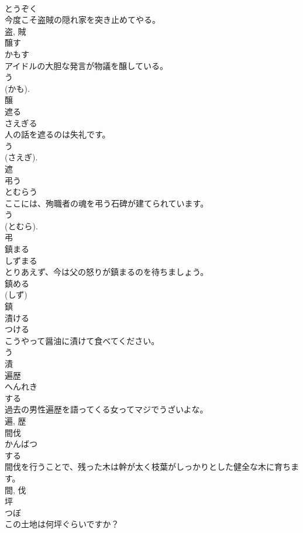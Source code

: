 \documentclass[8pt]{extreport}
\begin{document}
\begin{CJK}{UTF8}{min}
\\	とうぞく	
\\	今度こそ盗賊の隠れ家を突き止めてやる。	
\\	盗, 賊	
\\	醸す	
\\	かもす	
\\	アイドルの大胆な発言が物議を醸している。	
\\	う 
\\	(かも). 
\\	醸	
\\	遮る	
\\	さえぎる	
\\	人の話を遮るのは失礼です。	
\\	う 
\\	(さえぎ). 
\\	遮	
\\	弔う	
\\	とむらう	
\\	ここには、殉職者の魂を弔う石碑が建てられています。	
\\	う 
\\	(とむら). 
\\	弔	
\\	鎮まる	
\\	しずまる	
\\	とりあえず、今は父の怒りが鎮まるのを待ちましょう。	
\\	鎮める 
\\	(しず) 
\\	鎮	
\\	漬ける	
\\	つける	
\\	こうやって醤油に漬けて食べてください。	
\\	う 
\\	漬	
\\	遍歴	
\\	へんれき	
\\	する 
\\	過去の男性遍歴を語ってくる女ってマジでうざいよな。	
\\	遍, 歴	
\\	間伐	
\\	かんばつ	
\\	する 
\\	間伐を行うことで、残った木は幹が太く枝葉がしっかりとした健全な木に育ちます。	
\\	間, 伐	
\\	坪	
\\	つぼ	
\\	この土地は何坪ぐらいですか？	

\end{CJK}
\end{document}
